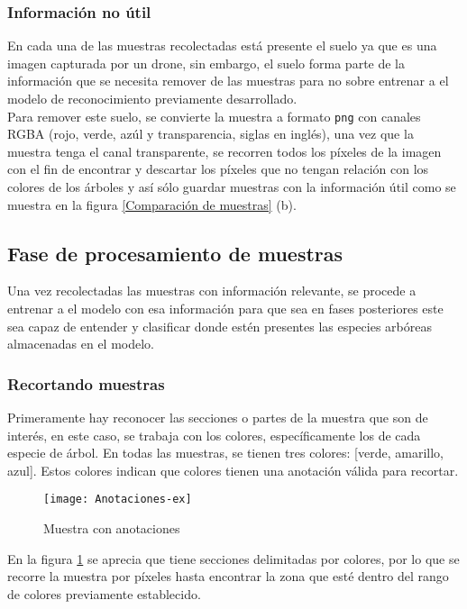 \documentclass[review]{elsarticle}
\begin{document}
\subsubsection{Información no útil}
En cada una de las muestras recolectadas está presente el suelo ya que es una imagen capturada por un drone, sin embargo, el suelo forma parte de la información que se necesita remover de las muestras para no sobre entrenar a el modelo de reconocimiento previamente desarrollado.\\

Para remover este suelo, se convierte la muestra a formato \texttt{png} con canales  RGBA (rojo, verde, azúl y transparencia, siglas en inglés), una vez que la muestra tenga el canal transparente, se recorren todos los píxeles de la imagen con el fin de encontrar y descartar los píxeles que no tengan relación con los colores de los árboles y así sólo guardar muestras con la información útil como se muestra en la figura \ref{Comparación de muestras} (b).

\subsection{Fase de procesamiento de muestras}
Una vez recolectadas las muestras con información relevante, se procede a  entrenar a el modelo con esa información para que sea en fases posteriores este sea capaz de entender y clasificar donde estén presentes las especies arbóreas almacenadas en el modelo.

\subsubsection{Recortando muestras}
Primeramente hay reconocer las secciones o partes de la muestra que son de interés, en este caso, se trabaja con los colores, específicamente los de cada especie de árbol. En todas las muestras, se tienen tres colores: [verde, amarillo, azul]. Estos colores indican que colores tienen una anotación válida para recortar.

\begin{figure}[H]
  \centering
      \texttt{[image: Anotaciones-ex]}
    \caption{Muestra con anotaciones}
    \label{Muestra con anotaciones}
\end{figure}

En la figura \ref{Muestra con anotaciones} se aprecia que tiene secciones delimitadas por colores, por lo que se recorre la muestra por píxeles hasta encontrar la zona que esté dentro del rango de colores previamente establecido.
\end{document}
